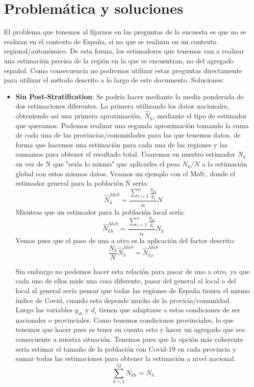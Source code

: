 \documentclass{article}
\begin{document}
\section{Problemática y soluciones}
El problema que tenemos al fijarnos en las preguntas de la encuesta es que no se realizan en el contexto de España, si no que se realizan en un contexto regional/autonómico. De esta forma, los estimadores que tenemos van a realizar una estimación precisa de la región en la que se encuentran, no del agregado español. Como consecuencia no podremos utilizar estas preguntas directamente para utilizar el método descrito a lo largo de este documento. 
Soluciones:
\begin{itemize}
    \item \textbf{Sin Post-Stratification}: Se podría hacer mediante la media ponderada de dos estimaciones diferentes. La primera utilizando los datos nacionales, obteniendo así una primera aproximación, $\widehat{N}_h$, mediante el tipo de estimador que queramos. Podemos realizar una segunda aproximación tomando la suma de cada una de las provincias/comunidades para las que tenemos datos, de forma que hacemos una estimación para cada una de las regiones y las sumamos para obtener el resultado total. Usaremos en nuestro estimador $N_k$ en vez de N que "sería lo mismo" que aplicarles el peso $N_k/N$ a la estimación global con estos mismos datos. Veamos un ejemplo con el MoS:, donde el estimador general para la población N sería:
    $$\hat{N}_h^{MoS} =  \frac{\sum_{i = 1}^n\frac{y_{ih}}{\hat{d}_i}}{n}N $$
    Mientras que un estimador para la población local sería:
     $$\hat{N}_{kh}^{MoS} =  \frac{\sum_{i = 1}^n\frac{y_{ih}}{\hat{d}_i}}{n}N_k $$
     Vemos pues que el paso de una a otra es la aplicación del factor descrito:
     $$\frac{N_k}{N} \hat{N}_h^{MoS} = \hat{N}_{hj}^{MoS}$$
     
     Sin embargo no podemos hacer esta relación para pasar de uno a otro, ya que cada uno de ellos mide una cosa diferente, pasar del general al local o del local al general sería pensar que todas las regiones de España tienen el mismo índice de Covid, cuando esto depende mucho de la provicia/comunidad. Luego las variables $y_{ih}$ y $d_i$ tienen que adaptarse a estas condiciones de ser nacionales o provinciales. Como tenemos condiciones provinciales, lo que tenemos que hacer pues es tener en cuenta esto y hacer un agregado que sea consecuente a nuestra situación. Tenemos pues que la opción más coherente sería estimar el tamaño de la población con Covid-19 en cada provincia y sumar todas las estimaciones para obtener la estimación a nivel nacional.
   $$\sum_{k=1}^{52} N_{kh} = N_h$$
    

\end{itemize}
\end{document}
